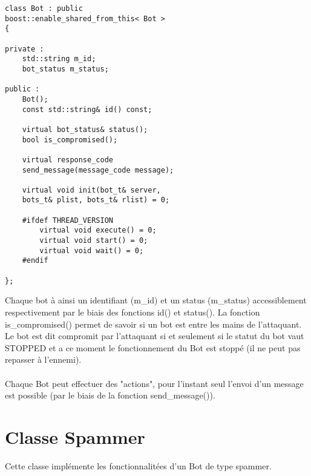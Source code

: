 \documentclass[11pt]{article}
\begin{document}
\begin{minipage}[c]{.46\linewidth}
\begin{verbatim} 
class Bot : public 
boost::enable_shared_from_this< Bot >
{

private :
	std::string m_id;
	bot_status m_status;

public :
	Bot();
	const std::string& id() const;
	
	virtual bot_status& status();
	bool is_compromised();
	
	virtual response_code 
	send_message(message_code message);
	
	virtual void init(bot_t& server, 
	bots_t& plist, bots_t& rlist) = 0;
	
	#ifdef THREAD_VERSION
		virtual void execute() = 0;
		virtual void start() = 0;
		virtual void wait() = 0;
	#endif
	
};
\end{verbatim}	
\end{minipage} \hfill
\begin{minipage}[c]{.46\linewidth}
Chaque bot à ainsi un identifiant (m\_id) et un status (m\_status) accessiblement respectivement par le biais des fonctions id() et status(). La fonction is\_compromised() permet de savoir si un bot est entre les mains de l'attaquant. Le bot est dit compromit par l'attaquant si et seulement si le statut du bot vaut STOPPED et a ce moment le fonctionnement du Bot est stoppé (il ne peut pas repasser à l'ennemi).\\\\Chaque Bot peut effectuer des "actions", pour l'instant seul l'envoi d'un message est possible (par le biais de la fonction send\_message()).
\end{minipage}

\newpage
\section{Classe Spammer}
Cette classe implémente les fonctionnalitées d'un Bot de type spammer.\\
\end{document}
